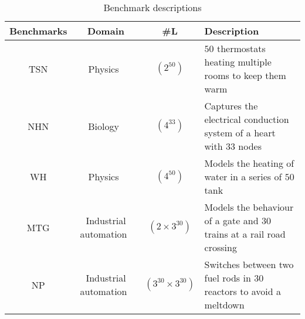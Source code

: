 \begin{table*}
	\centering
	\caption{Benchmark descriptions
	\label{tab:benchmarks}}
\begin{tabular}{ | c | c | c | l | } \hline
\textbf{Benchmarks}
	& \textbf{Domain} 
	& \textbf{\#L } 
	& \textbf{Description} \\ \hline

	\acf{TSN}
		& Physics~\cite{Pedro2005}
		& $(2^{50})$
		& $50$ thermostats heating multiple rooms to keep them warm\\ \hline
		
	\acf{NHN}
		& Biology~\cite{chen201487}
		& $(4^{33})$
		& Captures the electrical conduction system of a heart with $33$ nodes\\ \hline

	\acf{WH}
		& Physics~\cite{raskin05}
		& $(4^{50})$
		& Models the heating of water in a series of $50$ tank\\ \hline
		
	\acf{MTG}  
		& Industrial automation~\cite{Costello2013}
		& $(2 \times 3^{30})$
		& Models the behaviour of a gate and $30$ trains at a rail road crossing\\ \hline
		
	\acf{NP}
		& Industrial automation~\cite{alur2015book}
		& $(3^{30} \times 3^{30})$
		& Switches between two fuel rods in $30$ reactors to avoid a meltdown\\ \hline
	
	
 \end{tabular}
 \end{table*}